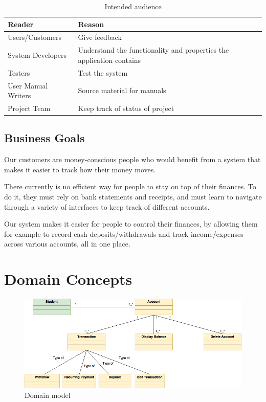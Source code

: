 \documentclass[12pt]{article}
\begin{document}
\begin{table}[htbp]
\caption{Intended audience}
\label{tab:intended_audience}
\begin{center}
  \begin{tabular}{|l|p{10cm}|}
      \hline
      Reader & Reason\\
      \hline\hline
      Users/Customers & Give feedback\\
      \hline
      System Developers & Understand the functionality and properties the application contains\\
      \hline
      Testers & Test the system\\
      \hline
      User Manual Writers & Source material for manuals\\
      \hline
      Project Team & Keep track of status of project\\
      \hline
  \end{tabular}
\end{center}
\end{table}

\subsection{Business Goals}
Our customers are money-conscious people who would benefit from a system that makes it easier to track how their money moves.

There currently is no efficient way for people to stay on top of their finances. To do it, they must rely on bank statements and receipts, and must learn to navigate through a variety of interfaces to keep track of different accounts. 

Our system makes it easier for people to control their finances, by allowing them for example to record cash deposits/withdrawals and track income/expenses across various accounts, all in one place.

\section{Domain Concepts}

\begin{figure}[h]
  \centering
  \includegraphics[width=130mm,natwidth=806,natheight=332]{Domain_model.png}
  \caption{Domain model}
  \label{fig:model}
\end{figure}
 
\end{document}

